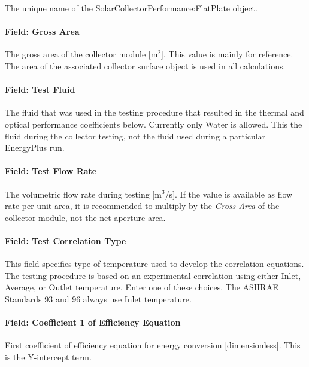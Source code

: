 The unique name of the SolarCollectorPerformance:FlatPlate object.

\paragraph{Field: Gross Area}\label{field-gross-area}

The gross area of the collector module {[}m\(^{2}\){]}. This value is mainly for reference. The area of the associated collector surface object is used in all calculations.

\paragraph{Field: Test Fluid}\label{field-test-fluid}

The fluid that was used in the testing procedure that resulted in the thermal and optical performance coefficients below. Currently only Water is allowed. This the fluid during the collector testing, not the fluid used during a particular EnergyPlus run.

\paragraph{Field: Test Flow Rate}\label{field-test-flow-rate}

The volumetric flow rate during testing {[}m\(^{3}\)/s{]}. If the value is available as flow rate per unit area, it is recommended to multiply by the \emph{Gross Area} of the collector module, not the net aperture area.

\paragraph{Field: Test Correlation Type}\label{field-test-correlation-type}

This field specifies type of temperature used to develop the correlation equations. The testing procedure is based on an experimental correlation using either Inlet, Average, or Outlet temperature. Enter one of these choices. The ASHRAE Standards 93 and 96 always use Inlet temperature.

\paragraph{Field: Coefficient 1 of Efficiency Equation}\label{field-coefficient-1-of-efficiency-equation}

First coefficient of efficiency equation for energy conversion {[}dimensionless{]}. This is the Y-intercept term.

